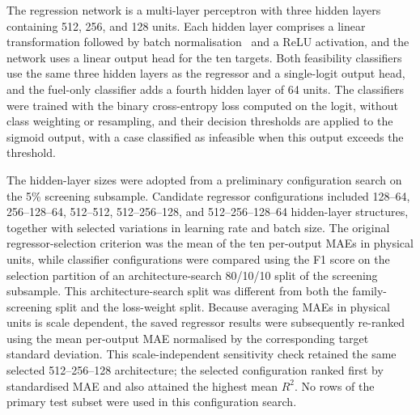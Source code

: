 \documentclass[final,5p,times,twocolumn,numbers]{elsarticle}
\begin{document}
The regression network is a multi-layer perceptron with three hidden layers containing 512, 256, and 128 units. Each hidden layer comprises a linear transformation followed by batch normalisation~\cite{ioffe2015batchnorm} and a ReLU activation, and the network uses a linear output head for the ten targets. Both feasibility classifiers use the same three hidden layers as the regressor and a single-logit output head, and the fuel-only classifier adds a fourth hidden layer of 64 units. The classifiers were trained with the binary cross-entropy loss computed on the logit, without class weighting or resampling, and their decision thresholds are applied to the sigmoid output, with a case classified as infeasible when this output exceeds the threshold.

The hidden-layer sizes were adopted from a preliminary configuration search on the 5\% screening subsample. Candidate regressor configurations included 128--64, 256--128--64, 512--512, 512--256--128, and 512--256--128--64 hidden-layer structures, together with selected variations in learning rate and batch size. The original regressor-selection criterion was the mean of the ten per-output MAEs in physical units, while classifier configurations were compared using the F1 score on the selection partition of an architecture-search 80/10/10 split of the screening subsample. This architecture-search split was different from both the family-screening split and the loss-weight split. Because averaging MAEs in physical units is scale dependent, the saved regressor results were subsequently re-ranked using the mean per-output MAE normalised by the corresponding target standard deviation. This scale-independent sensitivity check retained the same selected 512--256--128 architecture; the selected configuration ranked first by standardised MAE and also attained the highest mean $R^2$. No rows of the primary test subset were used in this configuration search.
\end{document}
